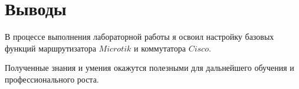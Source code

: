 \section{Выводы}
В процессе выполнения лабораторной работы я освоил настройку базовых функций маршрутизатора $Microtik$ и коммутатора $Cisco$. 

Полученные знания и умения окажутся полезными для дальнейшего обучения и профессионального роста.
\pagebreak
